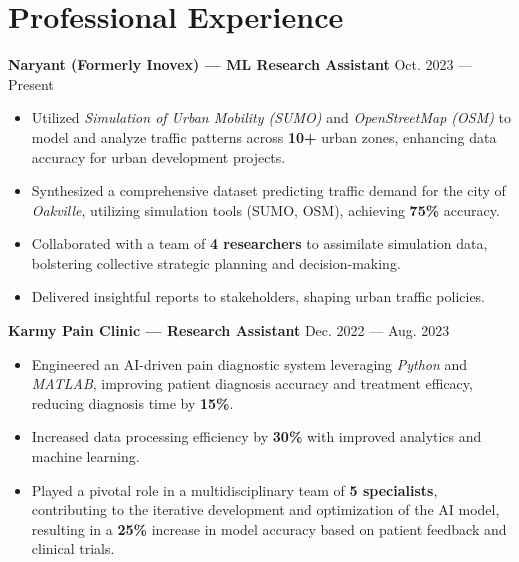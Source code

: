 \documentclass[a4paper, 12pt]{article}
\begin{document}
\section{Professional Experience}

\textcolor{imptextblack}{\textbf{Naryant (Formerly Inovex) --- ML Research Assistant}} \hfill Oct. 2023 --- Present
\begin{itemize}[nosep, after=\strut, itemsep=2pt]
    \item Utilized \textcolor{imptextblack}{\textit{Simulation of Urban Mobility (SUMO)}}
          and \textcolor{imptextblack}{\textit{OpenStreetMap (OSM)}} to model and analyze
          traffic patterns across \textcolor{imptextblack}{\textbf{10+}} urban zones,
          enhancing data accuracy for urban development projects.
    \item Synthesized a comprehensive dataset predicting traffic demand for the city of
          \textcolor{imptextblack}{\textit{Oakville}}, utilizing simulation tools (SUMO,
          OSM), achieving \textcolor{imptextblack}{\textbf{75\%}} accuracy.
    \item Collaborated with a team of \textcolor{imptextblack}{\textbf{4 researchers}} to
          assimilate simulation data, bolstering collective strategic planning and
          decision-making.
    \item Delivered insightful reports to stakeholders, shaping urban traffic policies.
\end{itemize}

\textcolor{imptextblack}{\textbf{Karmy Pain Clinic --- Research Assistant}} \hfill Dec. 2022 --- Aug. 2023
\begin{itemize}[nosep, after=\strut, itemsep=2pt]
    \item Engineered an AI-driven pain diagnostic system leveraging
          \textcolor{imptextblack}{\textit{Python}} and
          \textcolor{imptextblack}{\textit{MATLAB}}, improving patient diagnosis accuracy
          and treatment efficacy, reducing diagnosis time by
          \textcolor{imptextblack}{\textbf{15\%}}.
    \item Increased data processing efficiency by \textcolor{imptextblack}{\textbf{30\%}}
          with improved analytics and machine learning.
    \item Played a pivotal role in a multidisciplinary team of
          \textcolor{imptextblack}{\textbf{5 specialists}}, contributing to the iterative
          development and optimization of the AI model, resulting in a
          \textcolor{imptextblack}{\textbf{25\%}} increase in model accuracy based on
          patient feedback and clinical trials.
\end{itemize}
\end{document}
